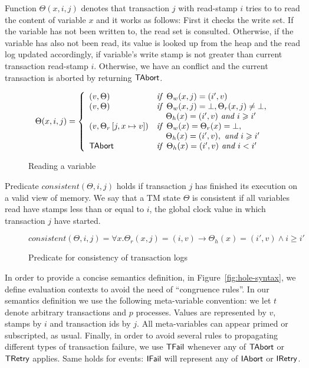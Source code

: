 \documentclass[sigplan]{acmart}
\renewcommand{\geq}{\geqslant}
\theoremstyle{definition}
\newcommand{\C}[1]{\red{\mathsf{#1}}}
\begin{document}
Function $\Theta(x,i,j)$ denotes that transaction $j$ with read-stamp $i$ tries to
to read the content of variable $x$ and it works as follows:
First it checks the write set. If the variable has not been written to, the read set is consulted.
Otherwise, if the variable has also not been read, its value is looked up from the heap and the read log updated accordingly, if
variable's write stamp is not greater than current transaction read-stamp $i$. Otherwise, we have an conflict and the current
transaction is aborted by returning \ensuremath{\C{TAbort}}.

\begin{figure}[h]
  \[
  \Theta(x,i,j) = \left\{
  \begin{array}{ll}
     (v,\Theta) & \textit{if }\:\Theta_w(x,j) = (i',v)\\
     (v,\Theta) & \textit{if }\:\Theta_w(x,j) = \bot,\Theta_r(x,j) \neq \bot, \\
                & \:\:\:\:\: \Theta_h(x) = (i',v) \textit{ and } i \geq i'\\
     (v, \Theta_r\,[j,x \mapsto v]) & 
        \textit{if }\:\Theta_w(x) = \Theta_r(x) = \bot,\\
                                       & \:\:\:\:\:  \Theta_h(x) = (i',v),
                                     \textit{ and } i \geq i' \\
                           \ensuremath{\C{TAbort}} & \textit{if }\: \Theta_h(x) = (i',v)
                                    \textit{ and } i < i'
  \end{array}
                                  \right.
  \]
  \centering
  \caption{Reading a variable}
  \label{fig:readvar}
\end{figure}

Predicate $consistent(\Theta,i,j)$ holds if transaction $j$ has finished its execution
on a valid view of memory. We say that a TM state $\Theta$ is consistent if all variables read
have stamps less than or equal to $i$, the global clock value in which transaction $j$ have started.

\begin{figure}[h]
  \[
     consistent(\Theta,i,j) = \forall x. \Theta_r(x,j) = (i,v) \to
     \Theta_h(x) = (i',v) \land i \geq i'
  \]
  \centering
  \caption{Predicate for consistency of transaction logs}
  \label{fig:consistency}
\end{figure}


In order to provide a concise semantics definition, in Figure~\ref{fig:hole-syntax},
we define evaluation contexts to avoid the need of ``congruence rules''. In our
semantics definition we use the following meta-variable convention: we let $t$
denote arbitrary transactions and $p$ processes. Values are represented by $v$,
stamps by $i$ and transaction ids by $j$. All meta-variables can appear primed or subscripted, as
usual. Finally, in order to avoid several rules to propagating different types of
transaction failure, we use \ensuremath{\C{TFail}} whenever any of \ensuremath{\C{TAbort}} or \ensuremath{\C{TRetry}} applies.
Same holds for events: \ensuremath{\C{IFail}} will represent any of \ensuremath{\C{IAbort}} or \ensuremath{\C{IRetry}}.  
\end{document}
